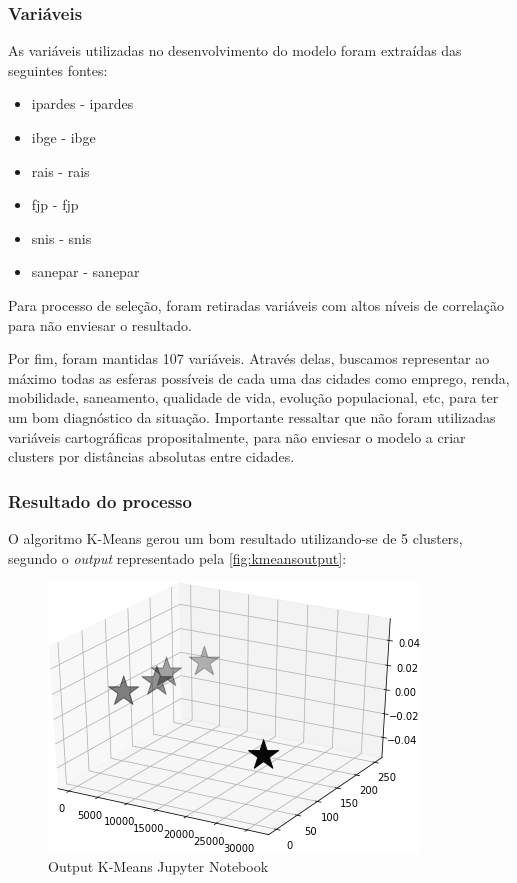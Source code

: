 	\subsubsection{Variáveis}
	
	As variáveis utilizadas no desenvolvimento do modelo foram extraídas das seguintes fontes:
	
	\begin{itemize}
		\item \gls{ipardes} - \glsdesc{ipardes}
		\item \gls{ibge} - \glsdesc{ibge}
		\item \gls{rais} - \glsdesc{rais}
		\item \gls{fjp} - \glsdesc{fjp}
		\item \gls{snis} - \glsdesc{snis}
		\item \gls{sanepar} - \glsdesc{sanepar}
	\end{itemize}

	Para processo de seleção, foram retiradas variáveis com altos níveis de correlação para não enviesar o resultado. 
	
	Por fim, foram mantidas 107 variáveis. Através delas, buscamos representar ao máximo todas as esferas possíveis de cada uma das cidades como emprego, renda, mobilidade, saneamento, qualidade de vida, evolução populacional, etc, para ter um bom diagnóstico da situação. Importante ressaltar que não foram utilizadas variáveis cartográficas propositalmente, para não enviesar o modelo a criar clusters por distâncias absolutas entre cidades.
	
	\subsubsection{Resultado do processo}
	
	O algoritmo K-Means gerou um bom resultado utilizando-se de 5 clusters, segundo o \textit{output} representado pela \autoref{fig:kmeansoutput}:
	
	\begin{figure}
		\centering
		\caption{Output K-Means Jupyter Notebook}
		\label{fig:kmeansoutput}
		\includegraphics[width=0.5\linewidth]{img/machine_B}
	\end{figure}

